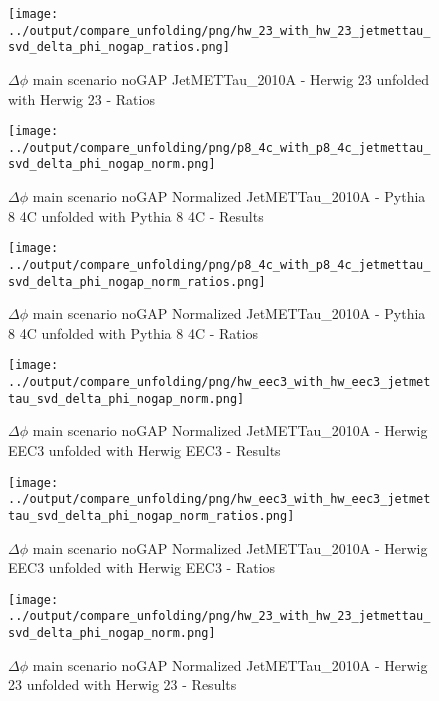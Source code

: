 \documentclass[11pt]{book}
\begin{document}
\begin{figure}[ht]
\centering
\texttt{[image: ../output/compare\_unfolding/png/hw\_23\_with\_hw\_23\_jetmettau\_svd\_delta\_phi\_nogap\_ratios.png]}
\caption{$\Delta\phi$ main scenario noGAP JetMETTau\_2010A - Herwig 23 unfolded with Herwig 23 - Ratios}
\label{hw_23_hw_23_jetmettau_svd_delta_phi_nogap_b}
\end{figure}



\begin{figure}[ht]
\centering
\texttt{[image: ../output/compare\_unfolding/png/p8\_4c\_with\_p8\_4c\_jetmettau\_svd\_delta\_phi\_nogap\_norm.png]}
\caption{$\Delta\phi$ main scenario noGAP Normalized JetMETTau\_2010A - Pythia 8 4C unfolded with Pythia 8 4C - Results}
\label{p8_p8_jetmettau_svd_delta_phi_nogap_norm_a}
\end{figure}

\begin{figure}[ht]
\centering
\texttt{[image: ../output/compare\_unfolding/png/p8\_4c\_with\_p8\_4c\_jetmettau\_svd\_delta\_phi\_nogap\_norm\_ratios.png]}
\caption{$\Delta\phi$ main scenario noGAP Normalized JetMETTau\_2010A - Pythia 8 4C unfolded with Pythia 8 4C - Ratios}
\label{p8_p8_jetmettau_svd_delta_phi_nogap_norm_b}
\end{figure}

\begin{figure}[ht]
\centering
\texttt{[image: ../output/compare\_unfolding/png/hw\_eec3\_with\_hw\_eec3\_jetmettau\_svd\_delta\_phi\_nogap\_norm.png]}
\caption{$\Delta\phi$ main scenario noGAP Normalized JetMETTau\_2010A - Herwig EEC3 unfolded with Herwig EEC3 - Results}
\label{hw_eec3_hw_eec3_jetmettau_svd_delta_phi_nogap_norm_a}
\end{figure}

\begin{figure}[ht]
\centering
\texttt{[image: ../output/compare\_unfolding/png/hw\_eec3\_with\_hw\_eec3\_jetmettau\_svd\_delta\_phi\_nogap\_norm\_ratios.png]}
\caption{$\Delta\phi$ main scenario noGAP Normalized JetMETTau\_2010A - Herwig EEC3 unfolded with Herwig EEC3 - Ratios}
\label{hw_eec3_hw_eec3_jetmettau_svd_delta_phi_nogap_norm_b}
\end{figure}

\begin{figure}[ht]
\centering
\texttt{[image: ../output/compare\_unfolding/png/hw\_23\_with\_hw\_23\_jetmettau\_svd\_delta\_phi\_nogap\_norm.png]}
\caption{$\Delta\phi$ main scenario noGAP Normalized JetMETTau\_2010A - Herwig 23 unfolded with Herwig 23 - Results}
\label{hw_23_hw_23_jetmettau_svd_delta_phi_nogap_norm_a}
\end{figure}
\end{document}
